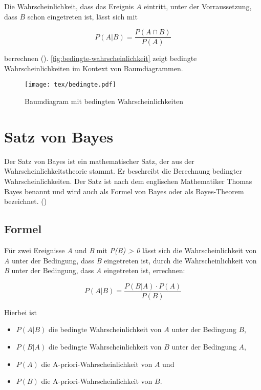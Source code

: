 Die Wahrscheinlichkeit, dass das Ereignis $A$ eintritt, unter der Vorraussetzung, dass $B$ schon eingetreten ist, lässt sich mit

\begin{equation*}
    P(A | B) = \frac{P(A \cap B)}{P(A)}
\end{equation*}

berrechnen (\cite[404]{Papula:2014}).
\autoref{fig:bedingte-wahrscheinlichkeit} zeigt bedingte Wahrscheinlichkeiten im Kontext von Baumdiagrammen.

\begin{figure}
    \centering
    \texttt{[image: tex/bedingte.pdf]}
    \caption{Baumdiagram mit bedingten Wahrscheinlichkeiten}\label{fig:bedingte-wahrscheinlichkeit}
\end{figure}

\section{Satz von Bayes}

Der Satz von Bayes ist ein mathematischer Satz, der aus der Wahrscheinlichkeitstheorie stammt. Er beschreibt die Berechnung bedingter
Wahrscheinlichkeiten.
Der Satz ist nach dem englischen Mathematiker Thomas Bayes benannt und wird auch als Formel von Bayes oder als Bayes-Theorem bezeichnet. (\cite[S.406f]{Papula:2014})

\subsection{Formel}

Für zwei Ereignisse \textit{A} und \textit{B} mit \textit{P(B) > 0} lässt sich die Wahrscheinlichkeit von \textit{A} unter der Bedingung, dass \textit{B} eingetreten
ist, durch die Wahrscheinlichkeit von \textit{B} unter der Bedingung, dass \textit{A} eingetreten ist, errechnen:

\begin{equation*}
    P(A | B) = \frac{P(B | A) \cdot P(A)}{P(B)}
\end{equation*}

Hierbei ist

\begin{itemize}
    \item $P(A | B)$ die bedingte Wahrscheinlichkeit von $A$ unter der Bedingung $B$,
    \item $P(B | A)$ die bedingte Wahrscheinlichkeit von $B$ unter der Bedingung $A$,
    \item $P(A)$ die A-priori-Wahrscheinlichkeit von $A$ und
    \item $P(B)$ die A-priori-Wahrscheinlichkeit von $B$.
\end{itemize}

